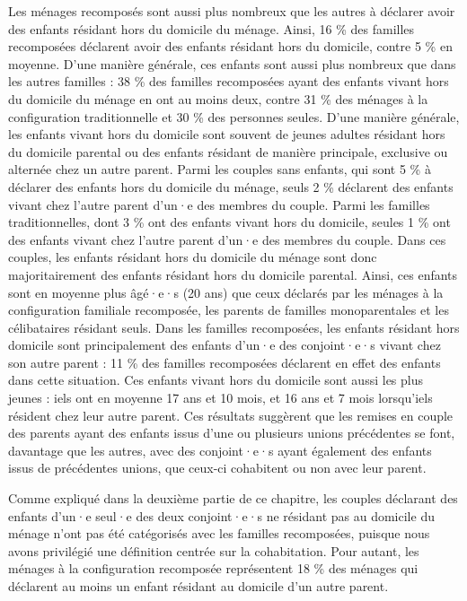 \documentclass[
  12pt,
]{book}
\begin{document}
Les ménages recomposés sont aussi plus nombreux que les autres à
déclarer avoir des enfants résidant hors du domicile du ménage. Ainsi,
16 \% des familles recomposées déclarent avoir des enfants résidant hors
du domicile, contre 5 \% en moyenne. D'une manière générale, ces enfants
sont aussi plus nombreux que dans les autres familles : 38 \% des
familles recomposées ayant des enfants vivant hors du domicile du ménage
en ont au moins deux, contre 31 \% des ménages à la configuration
traditionnelle et 30 \% des personnes seules. D'une manière générale,
les enfants vivant hors du domicile sont souvent de jeunes adultes
résidant hors du domicile parental ou des enfants résidant de manière
principale, exclusive ou alternée chez un autre parent. Parmi les
couples sans enfants, qui sont 5 \% à déclarer des enfants hors du
domicile du ménage, seuls 2 \% déclarent des enfants vivant chez l'autre
parent d'un·e des membres du couple. Parmi les familles traditionnelles,
dont 3 \% ont des enfants vivant hors du domicile, seules 1 \% ont des
enfants vivant chez l'autre parent d'un·e des membres du couple. Dans
ces couples, les enfants résidant hors du domicile du ménage sont donc
majoritairement des enfants résidant hors du domicile parental. Ainsi,
ces enfants sont en moyenne plus âgé·e·s (20 ans) que ceux déclarés par
les ménages à la configuration familiale recomposée, les parents de
familles monoparentales et les célibataires résidant seuls. Dans les
familles recomposées, les enfants résidant hors domicile sont
principalement des enfants d'un·e des conjoint·e·s vivant chez son autre
parent : 11 \% des familles recomposées déclarent en effet des enfants
dans cette situation. Ces enfants vivant hors du domicile sont aussi les
plus jeunes : iels ont en moyenne 17 ans et 10 mois, et 16 ans et 7 mois
lorsqu'iels résident chez leur autre parent. Ces résultats suggèrent que
les remises en couple des parents ayant des enfants issus d'une ou
plusieurs unions précédentes se font, davantage que les autres, avec des
conjoint·e·s ayant également des enfants issus de précédentes unions,
que ceux-ci cohabitent ou non avec leur parent.

Comme expliqué dans la deuxième partie de ce chapitre, les couples
déclarant des enfants d'un·e seul·e des deux conjoint·e·s ne résidant
pas au domicile du ménage n'ont pas été catégorisés avec les familles
recomposées, puisque nous avons privilégié une définition centrée sur la
cohabitation. Pour autant, les ménages à la configuration recomposée
représentent 18 \% des ménages qui déclarent au moins un enfant résidant
au domicile d'un autre parent.
\end{document}
